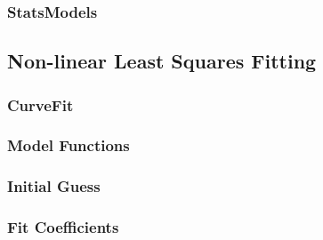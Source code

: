 \subsubsection{StatsModels}
\label{subsubsec:analysis--python--statsmodels}




\subsection{Non-linear Least Squares Fitting}
\label{subsec:analysis--fitting}



\subsubsection{CurveFit}
\label{subsubsec:analysis--fitting--curvefit}



\subsubsection{Model Functions}
\label{subsubsec:analysis--fitting--model_functions}



\subsubsection{Initial Guess}
\label{subsubsec:analysis--fitting--initial_guess}



\subsubsection{Fit Coefficients}
\label{subsubsec:analysis--fitting--fit_coefficients}




